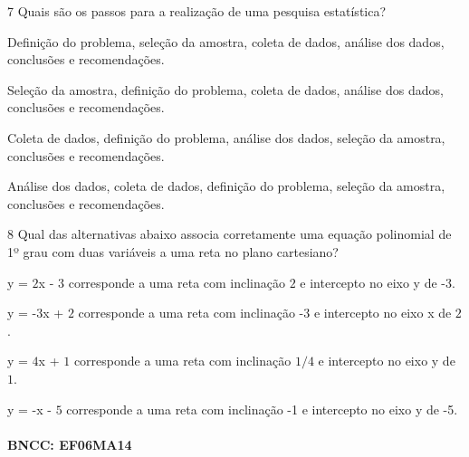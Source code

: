 {\num{7}  Quais são os passos para a realização de uma pesquisa estatística?

\begin{escolha}
\item Definição do problema, seleção da amostra, coleta de dados, análise
dos dados, conclusões e recomendações.
\item Seleção da amostra, definição do problema, coleta de dados, análise
dos dados, conclusões e recomendações.
\item Coleta de dados, definição do problema, análise dos dados, seleção da
amostra, conclusões e recomendações.
\item Análise dos dados, coleta de dados, definição do problema, seleção da
amostra, conclusões e recomendações.
\end{escolha}



\num{8}  Qual das alternativas abaixo associa corretamente uma equação
polinomial de 1º grau com duas variáveis a uma reta no plano cartesiano?

\begin{escolha}
\item y = $2$x - $3$ corresponde a uma reta com inclinação $2$ e intercepto no
eixo y de -3.
\item y = -3x + $2$ corresponde a uma reta com inclinação -3 e intercepto no
eixo x de $2$.
\item y = $4$x + $1$ corresponde a uma reta com inclinação $1/4$ e intercepto no
eixo y de $1$.
\item y = -x - $5$ corresponde a uma reta com inclinação -1 e intercepto no
eixo y de -5.
\end{escolha}

\paragraph{BNCC: EF06MA14}

}
